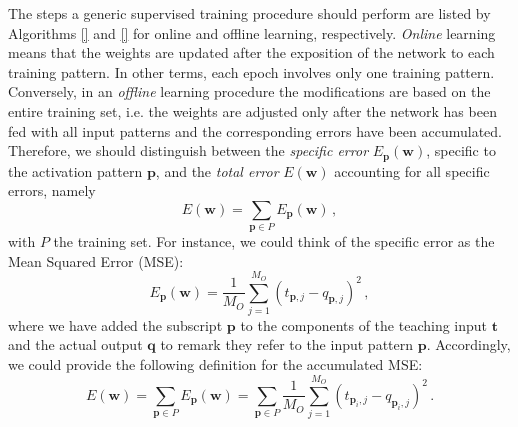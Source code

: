 \documentclass[11pt, a4paper]{report}
\numberwithin{equation}{chapter}
\theoremstyle{theorem}
\theoremstyle{definition}
\numberwithin{figure}{section}
\begin{document}
		The steps a generic supervised training procedure should perform are listed by Algorithms \ref{} and \ref{} for online and offline learning, respectively. \emph{Online} learning means that the weights are updated after the exposition of the network to each training pattern. In other terms, each epoch involves only one training pattern. Conversely, in an \emph{offline} learning procedure the modifications are based on the entire training set, i.e. the weights are adjusted only after the network has been fed with all input patterns and the corresponding errors have been accumulated. Therefore, we should distinguish between the \emph{specific error} $E_{\boldsymbol{p}}(\boldsymbol{w})$, specific to the activation pattern $\boldsymbol{p}$, and the \emph{total error} $E(\boldsymbol{w})$ accounting for all specific errors, namely
		\begin{equation}
			\label{eq:accumulated-error}
			E(\boldsymbol{w}) = \sum_{\boldsymbol{p} \in P} E_{\boldsymbol{p}}(\boldsymbol{w}) \, ,
		\end{equation}
		with $P$ the training set. For instance, we could think of the specific error as the Mean Squared Error (MSE): 
		\begin{equation}
			\label{eq:mse}
			E_{\boldsymbol{p}}(\boldsymbol{w}) = \dfrac{1}{M_O} \sum_{j = 1}^{M_O} \left( t_{\boldsymbol{p},j} - q_{\boldsymbol{p},j} \right)^2 \, ,
		\end{equation}
		where we have added the subscript $\boldsymbol{p}$ to the components of the teaching input $\boldsymbol{t}$ and the actual output $\boldsymbol{q}$ to remark they refer to the input pattern $\boldsymbol{p}$. Accordingly, we could provide the following definition for the accumulated MSE:
		\begin{equation}
			\label{eq:accumulated-mse}
			E(\boldsymbol{w}) = \sum_{\boldsymbol{p} \in P} E_{\boldsymbol{p}}(\boldsymbol{w}) = \sum_{\boldsymbol{p} \in P} \dfrac{1}{M_O} \sum_{j = 1}^{M_O} \left( t_{\boldsymbol{p}_i,j} - q_{\boldsymbol{p}_i,j} \right)^2 \, .
		\end{equation}
				
		\vspace*{0.3cm}
		
\end{document}
